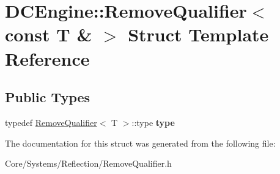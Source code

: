 \hypertarget{structDCEngine_1_1RemoveQualifier_3_01const_01T_01_6_01_4}{\section{D\-C\-Engine\-:\-:Remove\-Qualifier$<$ const T \& $>$ Struct Template Reference}
\label{structDCEngine_1_1RemoveQualifier_3_01const_01T_01_6_01_4}
}
\subsection*{Public Types}
\begin{DoxyCompactItemize}
\item 
\hypertarget{structDCEngine_1_1RemoveQualifier_3_01const_01T_01_6_01_4_ab4130f64ca77f64786e8bbb60042529a}{typedef \hyperlink{structDCEngine_1_1RemoveQualifier}{Remove\-Qualifier}$<$ T $>$\-::type {\bfseries type}}\label{structDCEngine_1_1RemoveQualifier_3_01const_01T_01_6_01_4_ab4130f64ca77f64786e8bbb60042529a}

\end{DoxyCompactItemize}


The documentation for this struct was generated from the following file\-:\begin{DoxyCompactItemize}
\item 
Core/\-Systems/\-Reflection/Remove\-Qualifier.\-h\end{DoxyCompactItemize}
